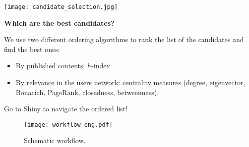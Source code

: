 \begin{minipage}{0.4\textwidth}
\texttt{[image: candidate\_selection.jpg]}
\end{minipage}\hfill
\begin{minipage}{0.55\textwidth}
{\bf\huge\color{oyellow} Which are the best candidates?}
\medskip

\noindent We use two different ordering algorithms to
rank the list of the candidates and find the best ones:
\begin{itemize}
\item By published contents: $h$-index
\item By relevance in the users network: centrality measures (degree, eigenvector,
 Bonacich, PageRank, closedness, betweenness).
\end{itemize}
\noindent Go to Shiny to navigate the ordered list!
\end{minipage}




\begin{sidewaysfigure}
\texttt{[image: workflow\_eng.pdf]}
\caption{Schematic workflow.}
\label{fig:workflow}
\end{sidewaysfigure}